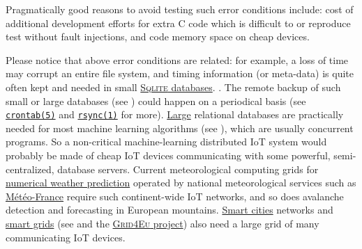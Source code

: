 {{\begin{itemize}
 \end{itemize}

 Pragmatically good reasons to avoid testing such error conditions
  include: cost of additional development
 efforts for extra C code which is difficult to or reproduce
    test
 without fault injections, and code memory space 
  on cheap devices.

 Please notice that above error conditions are related: for example, a
 loss of time may corrupt an entire file system,
  and timing information (or meta-data)
   is quite often kept and needed in
 small \href{http://sqlite.org/}{\textsc{Sqlite} databases}.
 . The remote backup
    of such
 small or large databases (see \cite{Date:2005:Database-in-Depth,
   kornacker:2015:impala}) could happen on a periodical basis (see
 \href{https://man7.org/linux/man-pages/man5/crontab.5.html}{\texttt{crontab(5)}}
 and 
 \href{https://man7.org/linux/man-pages/man1/rsync.1.html}{\texttt{rsync(1)}}
 for
 more). \href{https://softwareengineering.stackexchange.com/a/332071/40065}{Large}
 relational databases are practically needed for most machine learning
  algorithms (see
 \cite{flach:2012:machine-learning}), which are usually concurrent
  programs. So a non-critical machine-learning
 distributed IoT system would probably be made of cheap IoT devices
 communicating with some powerful, semi-centralized, database
  
  servers. Current meteorological computing
 grids for
 \href{https://en.wikipedia.org/wiki/Numerical_weather_prediction}{numerical
   weather prediction} operated by national meteorological services
 such as \href{http://meteofrance.com/}{Météo-France} require such
 continent-wide IoT networks, and so does 
  avalanche detection and forecasting in European
   
 mountains. \href{https://en.wikipedia.org/wiki/Smart_city}{Smart
   cities} networks and
 \href{https://en.wikipedia.org/wiki/Smart_grid}{smart grids} (see
 \cite{belarbi:2004:vehicle, mclaren:2015:sharing,
   delons:2008:pirandello, bakken:2014:smart-grids} and
  the
 \href{https://www.enedis.fr/grid4eu}{\textsc{Grid4Eu} project}) also
 need a large grid of many communicating IoT devices.

}}
